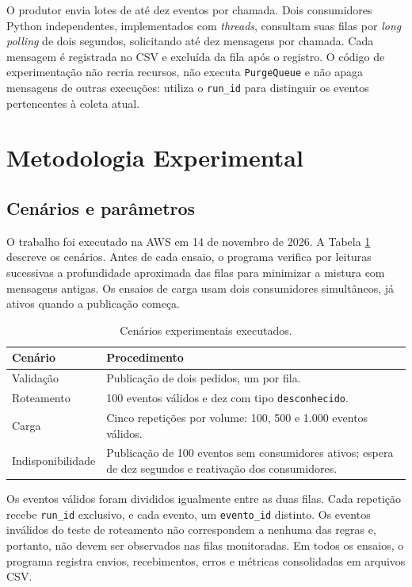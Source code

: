 \documentclass[12pt]{article}
\begin{document}
O produtor envia lotes de até dez eventos por chamada. Dois consumidores
Python independentes, implementados com \emph{threads}, consultam suas filas
por \emph{long polling} de dois segundos, solicitando até dez mensagens por
chamada. Cada mensagem é registrada no CSV e excluída da fila após o registro.
O código de experimentação não recria recursos, não executa
\texttt{PurgeQueue} e não apaga mensagens de outras execuções: utiliza o
\texttt{run\_id} para distinguir os eventos pertencentes à coleta atual.

\section{Metodologia Experimental}
\subsection{Cenários e parâmetros}
O trabalho foi executado na AWS em 14 de novembro de 2026. A Tabela
\ref{tab:cenarios} descreve os cenários. Antes de cada ensaio, o programa
verifica por leituras sucessivas a profundidade aproximada das filas para
minimizar a mistura com mensagens antigas. Os ensaios de carga usam dois
consumidores simultâneos, já ativos quando a publicação começa.

\begin{table}[ht]
\centering
\caption{Cenários experimentais executados.}
\label{tab:cenarios}
\small
\setlength{\tabcolsep}{5pt}
\begin{tabular}{p{3.1cm}p{10.1cm}}
\toprule
Cenário & Procedimento \\
\midrule
Validação & Publicação de dois pedidos, um por fila. \\
Roteamento & 100 eventos válidos e dez com tipo \texttt{desconhecido}. \\
Carga & Cinco repetições por volume: 100, 500 e 1.000 eventos válidos. \\
Indisponibilidade & Publicação de 100 eventos sem consumidores ativos;
 espera de dez segundos e reativação dos consumidores. \\
\bottomrule
\end{tabular}
\end{table}

Os eventos válidos foram divididos igualmente entre as duas filas. Cada
repetição recebe \texttt{run\_id} exclusivo, e cada evento, um
\texttt{evento\_id} distinto. Os eventos inválidos do teste de roteamento
não correspondem a nenhuma das regras e, portanto, não devem ser observados
nas filas monitoradas. Em todos os ensaios, o programa registra envios,
recebimentos, erros e métricas consolidadas em arquivos CSV.
\end{document}
